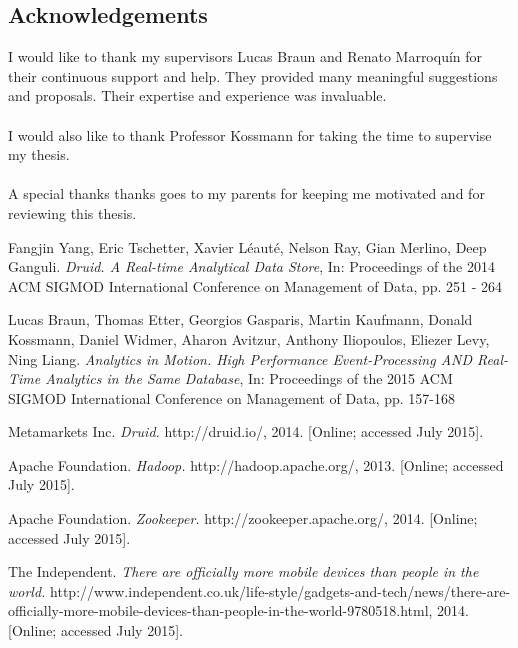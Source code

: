 \documentclass[11pt,singlecolumn]{scrartcl}
\begin{document}
\subsection{Acknowledgements}
I would like to thank my supervisors Lucas Braun and Renato Marroquín for their continuous support and help. They provided many meaningful suggestions and proposals. Their expertise and experience was invaluable.\\\\
I would also like to thank Professor Kossmann for taking the time to supervise my thesis.\\\\
A special thanks thanks goes to my parents for keeping me motivated and for reviewing this thesis.

\clearpage

\begin{thebibliography}{1}
 Fangjin Yang, Eric Tschetter, Xavier Léauté, Nelson Ray, Gian Merlino, Deep Ganguli.
{\em Druid. A Real-time Analytical Data Store}, In: Proceedings of the 2014 ACM SIGMOD International Conference on Management of Data, pp. 251 - 264

 Lucas Braun, Thomas Etter, Georgios Gasparis,
Martin Kaufmann, Donald Kossmann, Daniel Widmer, Aharon Avitzur, Anthony Iliopoulos, Eliezer Levy, Ning Liang.
{\em Analytics in Motion. High Performance Event-Processing AND Real-Time Analytics in the Same Database}, In: Proceedings of the 2015 ACM SIGMOD International Conference on Management of Data, pp. 157-168

Metamarkets Inc. {\em Druid.} http://druid.io/, 2014. [Online; accessed July 2015].

Apache Foundation. {\em Hadoop.} http://hadoop.apache.org/, 2013. [Online; accessed July 2015].

Apache Foundation. {\em Zookeeper.} http://zookeeper.apache.org/, 2014. [Online; accessed July 2015].

 The Independent. {\em There are officially more mobile devices than people in the world.} http://www.independent.co.uk/life-style/gadgets-and-tech/news/there-are-officially-more-mobile-devices-than-people-in-the-world-9780518.html, 2014. [Online; accessed July 2015].

\end{thebibliography}
\end{document}
